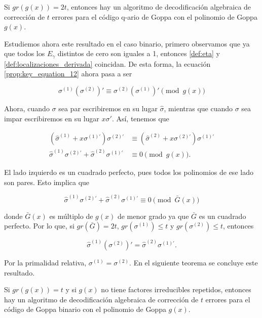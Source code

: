 \begin{theorem}
    Si $gr(g(x)) = 2t$, entonces hay un algoritmo de decodificación algebraica de corrección de $t$ errores para el código q-ario de Goppa con el polinomio de Goppa $g(x)$.
\end{theorem}

Estudiemos ahora este resultado en el caso binario, primero observamos que ya que todos los $E_\gamma$ distintos de cero son iguales a 1, entonces \ref{def:eta} y \ref{def:localizaciones_derivada} coincidan. De esta forma, la ecuación \ref{prop:key_equation_12} ahora pasa a ser

$$\sigma^{(1)} \left( \sigma^{(2)} \right) ' \equiv \sigma^{(2)} \left( \sigma^{(1)} \right) ' \pmod{g(x)}$$

Ahora, cuando $\sigma$ sea par escribiremos en su lugar $\hat{\sigma}$, mientras que cuando $\sigma$ sea impar escribiremos en su lugar $x \sigma '$. Así, tenemos que

\begin{align*} 
    \left( \hat{\sigma}^{(1)} + x \sigma^{(1)'} \right) \sigma^{(2)'} &\equiv \left( \hat{\sigma}^{(2)} + x \sigma^{(2)'} \right) \sigma^{(1)'}\\ 
    \hat{\sigma}^{(1)} \sigma^{(2)'} + \hat{\sigma}^{(2)} \sigma^{(1)'} &\equiv 0 \pmod{g(x)}.
\end{align*}

El lado izquierdo es un cuadrado perfecto, pues todos los polinomios de ese lado son pares. Esto implica que

$$\hat{\sigma}^{(1)} \sigma^{(2)'} + \hat{\sigma}^{(2)} \sigma^{(1)'} \equiv 0 \pmod{\bar{G}(x)}$$

donde $\bar{G}(x)$ es múltiplo de $g(x)$ de menor grado ya que $\bar{G}$ es un cuadrado perfecto. Por lo que, si $gr(\bar{G}) = 2t$, $gr(\sigma^{(1)}) \leq t$ y $gr(\sigma^{(2)}) \leq t$, entonces 

$$\hat{\sigma}^{(1)} \left( \sigma^{(2)} \right) ' = \hat{\sigma}^{(2)} \sigma^{(1)'}.$$

Por la primalidad relativa, $\sigma^{(1)} = \sigma^{(2)}$. En el siguiente teorema se concluye este resultado.

\begin{theorem}
    Si $gr(g(x)) = t$ y si $g(x)$ no tiene factores irreducibles repetidos, entonces hay un algoritmo de decodificación algebraica de corrección de $t$ errores para el código de Goppa binario con el polinomio de Goppa $g(x)$.
\end{theorem}


